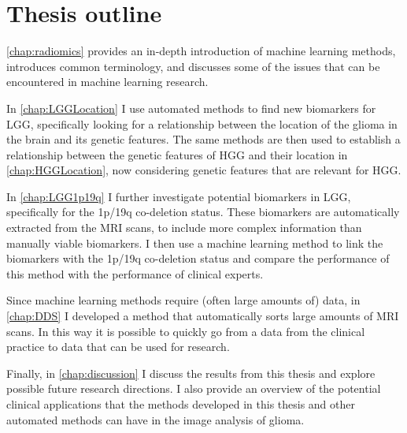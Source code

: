 \section{Thesis outline}

\cref{chap:radiomics} provides an in-depth introduction of machine learning methods, introduces common terminology, and discusses some of the issues that can be encountered in machine learning research.

In \cref{chap:LGGLocation} I use automated methods to find new biomarkers for \gls{LGG}, specifically looking for a relationship between the location of the glioma in the brain and its genetic features.
The same methods are then used to establish a relationship between the genetic features of \gls{HGG} and their location in \cref{chap:HGGLocation}, now considering genetic features that are relevant for \gls{HGG}.

In \cref{chap:LGG1p19q} I further investigate potential biomarkers in \gls{LGG}, specifically for the 1p/19q co-deletion status.
These biomarkers are automatically extracted from the \gls{MRI} scans, to include more complex information than manually viable biomarkers.
I then use a machine learning method to link the biomarkers with the 1p/19q co-deletion status and compare the performance of this method with the performance of clinical experts.

Since machine learning methods require (often large amounts of) data, in \cref{chap:DDS} I developed a method that automatically sorts large amounts of \gls{MRI} scans.
In this way it is possible to quickly go from a data from the clinical practice to data that can be used for research.

Finally, in \cref{chap:discussion} I discuss the results from this thesis and explore possible future research directions.
I also provide an overview of the potential clinical applications that the methods developed in this thesis and other automated methods can have in the image analysis of glioma.

